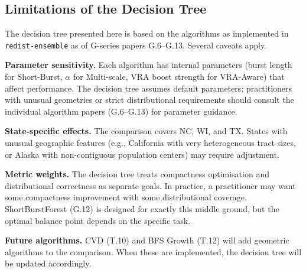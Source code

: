 \subsection{Limitations of the Decision Tree}

The decision tree presented here is based on the algorithms as implemented
in \texttt{redist-ensemble} as of G-series papers G.6--G.13.
Several caveats apply.

\textbf{Parameter sensitivity.}
Each algorithm has internal parameters (burst length for Short-Burst,
$\alpha$ for Multi-scale, VRA boost strength for VRA-Aware) that affect
performance.
The decision tree assumes default parameters; practitioners with unusual
geometries or strict distributional requirements should consult the
individual algorithm papers (G.6--G.13) for parameter guidance.

\textbf{State-specific effects.}
The comparison covers NC, WI, and TX.
States with unusual geographic features (e.g., California with very
heterogeneous tract sizes, or Alaska with non-contiguous population
centers) may require adjustment.

\textbf{Metric weights.}
The decision tree treats compactness optimisation and distributional
correctness as separate goals.
In practice, a practitioner may want some compactness improvement with
some distributional coverage.
ShortBurstForest (G.12) is designed for exactly this middle ground, but
the optimal balance point depends on the specific task.

\textbf{Future algorithms.}
CVD (T.10) and BFS Growth (T.12) will add geometric algorithms to the
comparison.
When these are implemented, the decision tree will be updated accordingly.
